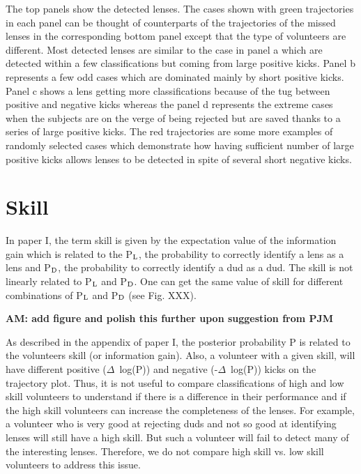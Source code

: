 \documentclass[useAMS,usenatbib,a4paper]{mn2e}
\begin{document}
The top panels show the detected lenses. The cases shown with green trajectories
in each panel can be thought of counterparts of the trajectories of the missed
lenses in the corresponding bottom panel except that the type of volunteers are
different. Most detected lenses are similar to the case in panel a which are
detected within a few classifications but coming from large positive kicks.
Panel b represents a few odd cases which are dominated mainly by short positive
kicks. Panel c shows a lens getting more classifications because of the tug
between positive and negative kicks whereas the panel d represents the extreme
cases when the subjects are on the verge of being rejected but are saved thanks
to a series of large positive kicks. The red trajectories are some more
examples of randomly selected cases which demonstrate how having sufficient
number of large positive kicks allows lenses to be detected in spite of several
short negative kicks.

\section{Skill}
\label{appendix:skill}
In paper I, the term skill is given by the expectation value of the
information gain which is related to the P$_{\rm L}$, the probability to
correctly identify a lens as a lens and P$_{\rm D}$, the probability to
correctly identify a dud as a dud. The skill is not linearly related to
 P$_{\rm L}$ and P$_{\rm D}$. One can get the same value of
skill for different combinations of P$_{\rm L}$ and P$_{\rm D}$ (see
Fig. XXX).

{\bf AM: add figure and polish this further upon suggestion from PJM}

As described in the appendix of paper I, the posterior probability P is
related to the volunteers skill (or information gain). Also, a volunteer
with a given skill, will have different positive ($\Delta$~log(P)) and
negative (-$\Delta$~log(P)) kicks on the trajectory plot. Thus, it is
not useful to compare classifications of high and low skill volunteers
to understand if there is a difference in their performance and if the
high skill volunteers can increase the completeness of the lenses. For
example, a volunteer who is very good at rejecting duds and not so good
at identifying lenses will still have a high skill. But such a
volunteer will fail to detect many of the interesting lenses. Therefore,
we do not compare high skill vs. low skill volunteers to address this
issue.
\end{document}
